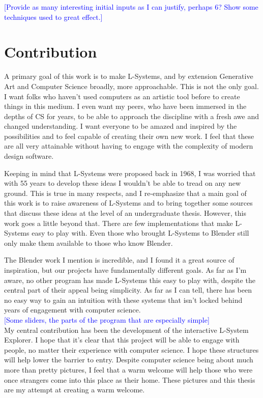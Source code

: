 \documentclass[12pt,twoside]{reedthesis}
\begin{document}
	\textcolor{blue}{[Provide as many interesting initial inputs as I can justify, perhaps 6? Show some techniques used to great effect.]}

\chapter{Contribution}
	A primary goal of this work is to make L-Systems, and by extension Generative Art and Computer Science broadly, more approachable. This is not the only goal. I want folks who haven't used computers as an artistic tool before to create things in this medium. I even want my peers, who have been immersed in the depths of CS for years, to be able to approach the discipline with a fresh awe and changed understanding. I want everyone to be amazed and inspired by the possibilities and to feel capable of creating their own new work.  I feel that these are all very attainable without having to engage with the complexity of modern design software.
	
	Keeping in mind that L-Systems were proposed back in 1968, I was worried that with 55 years to develop these ideas I wouldn't be able to tread on any new ground. This is true in many respects, and I re-emphasize that a main goal of this work is to raise awareness of L-Systems and to bring together some sources that discuss these ideas at the level of an undergraduate thesis. However, this work goes a little beyond that. There are few implementations that make L-Systems easy to play with. Even those who brought L-Systems to Blender still only make them available to those who know Blender.
	
	The Blender work I mention is incredible, and I found it a great source of inspiration, but our projects have fundamentally different goals. As far as I'm aware, no other program has made L-Systems this easy to play with, despite the central part of their appeal being simplicity. As far as I can tell, there has been no easy way to gain an intuition with these systems that isn't locked behind years of engagement with computer science.\\
	
	\textcolor{blue}{[Some sliders, the parts of the program that are especially simple]}\\
	
	My central contribution has been the development of the interactive L-System Explorer. I hope that it's clear that this project will be able to engage with people, no matter their experience with computer science. I hope these structures will help lower the barrier to entry. Despite computer science being about much more than pretty pictures, I feel that a warm welcome will help those who were once strangers come into this place as their home. These pictures and this thesis are my attempt at creating a warm welcome.
\end{document}
